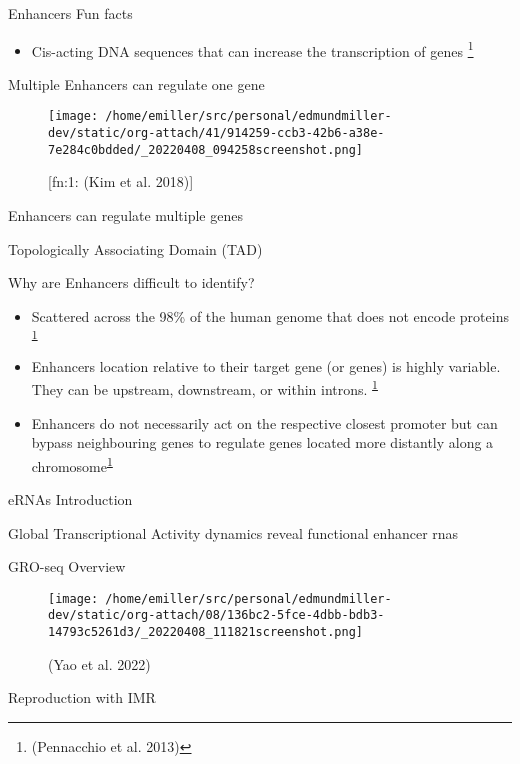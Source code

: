 \documentclass[presentation]{beamer}
\begin{document}
\begin{frame}[label={sec:orgd4d70ba}]{Enhancers Fun facts}
\begin{itemize}
\item Cis-acting DNA sequences that can increase the transcription of genes \footnote{(Pennacchio et al. 2013)\label{org986cd75}}
\end{itemize}
\end{frame}

\begin{frame}[label={sec:org268bda8}]{Multiple Enhancers can regulate one gene}
\begin{figure}[htbp]
\centering
\texttt{[image: /home/emiller/src/personal/edmundmiller-dev/static/org-attach/41/914259-ccb3-42b6-a38e-7e284c0bdded/\_20220408\_094258screenshot.png]}
\caption[Short caption]{[fn:1: (Kim et al. 2018)]}
\end{figure}
\end{frame}


\begin{frame}[label={sec:org60c8203}]{Enhancers can regulate multiple genes}
\end{frame}
\begin{frame}[label={sec:org22c6014}]{Topologically Associating Domain (TAD)}
\end{frame}
\begin{frame}[label={sec:orgb6d85ad}]{Why are Enhancers difficult to identify?}
\begin{itemize}
\item Scattered across the 98\% of the human genome that does not encode proteins \textsuperscript{\ref{org986cd75}}
\item Enhancers location relative to their target gene (or genes) is highly
variable. They can be upstream, downstream, or within introns. \textsuperscript{\ref{org986cd75}}
\item Enhancers do not necessarily act on the respective closest promoter but can
bypass neighbouring genes to regulate genes located more distantly along a
chromosome\textsuperscript{\ref{org986cd75}}
\end{itemize}
\end{frame}

\begin{frame}[label={sec:orge2681cf}]{eRNAs Introduction}
\end{frame}

\begin{frame}[label={sec:org8a56f61}]{Global Transcriptional Activity dynamics reveal functional enhancer rnas}
\begin{block}{GRO-seq Overview}
\begin{figure}[htbp]
\centering
\texttt{[image: /home/emiller/src/personal/edmundmiller-dev/static/org-attach/08/136bc2-5fce-4dbb-bdb3-14793c5261d3/\_20220408\_111821screenshot.png]}
\caption{(Yao et al. 2022)}
\end{figure}
\end{block}


\begin{block}{Reproduction with IMR}
\end{block}
\end{frame}
\end{document}
